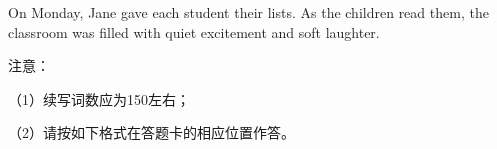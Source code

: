\documentclass{英语试卷}
\begin{document}
\par On Monday, Jane gave each student their lists. As the children read them, the classroom was filled with quiet excitement and soft laughter.\par
\par 注意：\par
\par （1）续写词数应为150左右；\par
\par （2）请按如下格式在答题卡的相应位置作答。\par
{}
\end{document}
